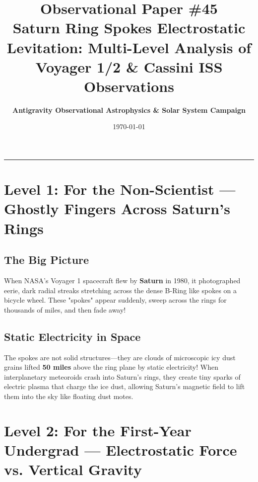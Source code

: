 \documentclass[11pt,a4paper]{article}
\title{\Huge \textbf{Observational Paper \#45}\\ \Large Saturn Ring Spokes Electrostatic Levitation: Multi-Level Analysis of Voyager 1/2 \& Cassini ISS Observations}
\author{\textbf{Antigravity Observational Astrophysics \& Solar System Campaign}}
\date{\today}
\begin{document}
\maketitle

\vspace{-1em}
\begin{center}
\rule{\textwidth}{1.5pt}
\end{center}

\section*{Level 1: For the Non-Scientist — Ghostly Fingers Across Saturn's Rings}

\subsection*{The Big Picture}
When NASA's Voyager 1 spacecraft flew by \textbf{Saturn} in 1980, it photographed eerie, dark radial streaks stretching across the dense B-Ring like spokes on a bicycle wheel. These "spokes" appear suddenly, sweep across the rings for thousands of miles, and then fade away!

\subsection*{Static Electricity in Space}
The spokes are not solid structures—they are clouds of microscopic icy dust grains lifted \textbf{50 miles} above the ring plane by static electricity! When interplanetary meteoroids crash into Saturn's rings, they create tiny sparks of electric plasma that charge the ice dust, allowing Saturn's magnetic field to lift them into the sky like floating dust motes.

\newpage

\section*{Level 2: For the First-Year Undergrad — Electrostatic Force vs. Vertical Gravity}
\end{document}
